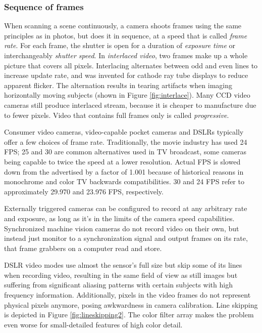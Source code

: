 \subsubsection{Sequence of frames} %


When scanning a scene continuously, a camera shoots frames using the same principles as in photos, but does it in sequence, at a speed that is called \emph{frame rate}.
For each frame, the shutter is open for a duration of \emph{exposure time} or interchangeably \emph{shutter speed}.
In \emph{interlaced video}, two frames make up a whole picture that covers all pixels.
Interlacing alternates between odd and even lines to increase update rate, and was invented for cathode ray tube displays to reduce apparent flicker.
The alternation results in tearing artifacts when imaging horizontally moving subjects (shown in Figure \ref{fig:interlace}).
Many CCD video cameras still produce interlaced stream, because it is cheaper to manufacture due to fewer pixels.
Video that contains full frames only is called \emph{progressive}.



Consumer video cameras, video-capable pocket cameras and DSLRs typically offer a few choices of frame rate. Traditionally, the movie industry has used 24 FPS; 25 and 30 are common alternatives used in TV broadcast, some cameras being capable to twice the speed at a lower resolution.
Actual FPS is slowed down from the advertised by a factor of 1.001 because of historical reasons in monochrome and color TV backwards compatibilities.
30 and 24 FPS refer to approximately 29.970 and 23.976 FPS, respectively.

Externally triggered cameras can be configured to record at any arbitrary rate and exposure, as long as it's in the limits of the camera speed capabilities.
Synchronized machine vision cameras do not record video on their own, but instead just monitor to a synchronization signal and output frames on its rate, that frame grabbers on a computer read and store.


DSLR video modes use almost the sensor's full size but skip some of its lines when recording video, resulting in the same field of view as still images but suffering from significant aliasing patterns with certain subjects with high frequency information.
Additionally, pixels in the video frames do not represent physical pixels anymore, posing awkwardness in camera calibration.
Line skipping is depicted in Figure \ref{fig:lineskipping2}.
The color filter array makes the problem even worse for small-detailed features of high color detail.

